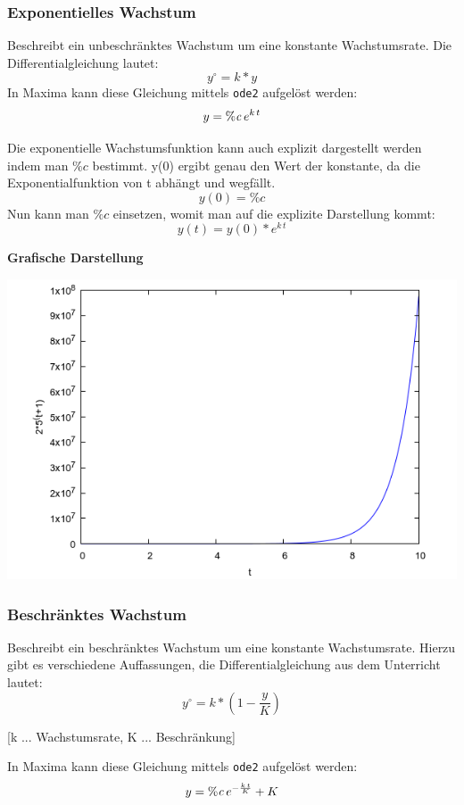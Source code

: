 \documentclass[a4paper,12pt]{article}
\begin{document}
\subsubsection{Exponentielles Wachstum}
Beschreibt ein unbeschränktes Wachstum um eine konstante Wachstumsrate.
Die Differentialgleichung lautet:
$$y^\circ      = k * y$$
In Maxima kann diese Gleichung mittels \texttt{ode2} aufgelöst werden:
$$y={\it \%c}\,e^{k\,t}$$

Die exponentielle Wachstumsfunktion kann auch explizit dargestellt werden indem man $\%c$ bestimmt.
y(0) ergibt genau den Wert der konstante, da die Exponentialfunktion von t abh\"angt und wegf\"allt.
$$y(0) = \%c$$
Nun kann man $\%c$ einsetzen, womit man auf die explizite Darstellung kommt:
$$y(t)    = y(0) * e^{k\,t}$$

\begin{flushleft}
 \textbf{Grafische Darstellung}
\end{flushleft}
\includegraphics[scale=0.6]{exponentielles-wachstum.png}

\subsubsection{Beschr\"anktes Wachstum}
Beschreibt ein beschränktes Wachstum um eine konstante Wachstumsrate. 
Hierzu gibt es verschiedene Auffassungen, die Differentialgleichung aus dem Unterricht lautet:
$$y^\circ      = k*(1 - \frac{y}{K})$$
\begin{center}
 \small{[k ... Wachstumsrate, K ... Beschr\"ankung]}
\end{center}
In Maxima kann diese Gleichung mittels \texttt{ode2} aufgelöst werden:
$$y={\it \%c}\,e^ {- {\frac{k\,t}{K}} }+K$$
\end{document}
